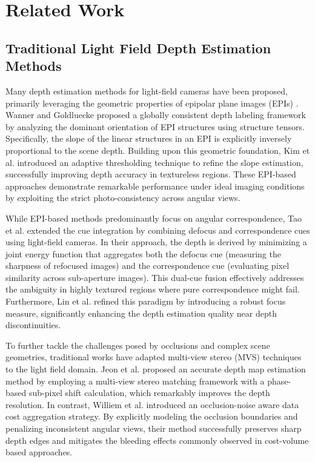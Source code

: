 \documentclass[lettersize,journal]{IEEEtran}
\begin{document}
\section{Related Work}

\subsection{Traditional Light Field Depth Estimation Methods}

Many depth estimation methods for light-field cameras have been proposed, primarily leveraging the geometric properties of epipolar plane images (EPIs) \cite{epipolar_plane_image,light_field_depth_estimation}. Wanner and Goldluecke \cite{Wanner,Goldluecke} proposed a globally consistent depth labeling framework by analyzing the dominant orientation of EPI structures using structure tensors. Specifically, the slope of the linear structures in an EPI is explicitly inversely proportional to the scene depth. Building upon this geometric foundation, Kim et al. \cite{Kim,EPI} introduced an adaptive thresholding technique to refine the slope estimation, successfully improving depth accuracy in textureless regions. These EPI-based approaches demonstrate remarkable performance under ideal imaging conditions by exploiting the strict photo-consistency across angular views.

While EPI-based methods predominantly focus on angular correspondence, Tao et al. \cite{Tao,defocus_and_correspondence} extended the cue integration by combining defocus and correspondence cues using light-field cameras. In their approach, the depth is derived by minimizing a joint energy function that aggregates both the defocus cue (measuring the sharpness of refocused images) and the correspondence cue (evaluating pixel similarity across sub-aperture images). This dual-cue fusion effectively addresses the ambiguity in highly textured regions where pure correspondence might fail. Furthermore, Lin et al. \cite{Lin,defocus} refined this paradigm by introducing a robust focus measure, significantly enhancing the depth estimation quality near depth discontinuities.

To further tackle the challenges posed by occlusions and complex scene geometries, traditional works have adapted multi-view stereo (MVS) techniques to the light field domain. Jeon et al. \cite{Jeon,MVS,lenslet} proposed an accurate depth map estimation method by employing a multi-view stereo matching framework with a phase-based sub-pixel shift calculation, which remarkably improves the depth resolution. In contrast, Williem et al. \cite{Williem,occlusion_noise} introduced an occlusion-noise aware data cost aggregation strategy. By explicitly modeling the occlusion boundaries and penalizing inconsistent angular views, their method successfully preserves sharp depth edges and mitigates the bleeding effects commonly observed in cost-volume based approaches.
\end{document}

